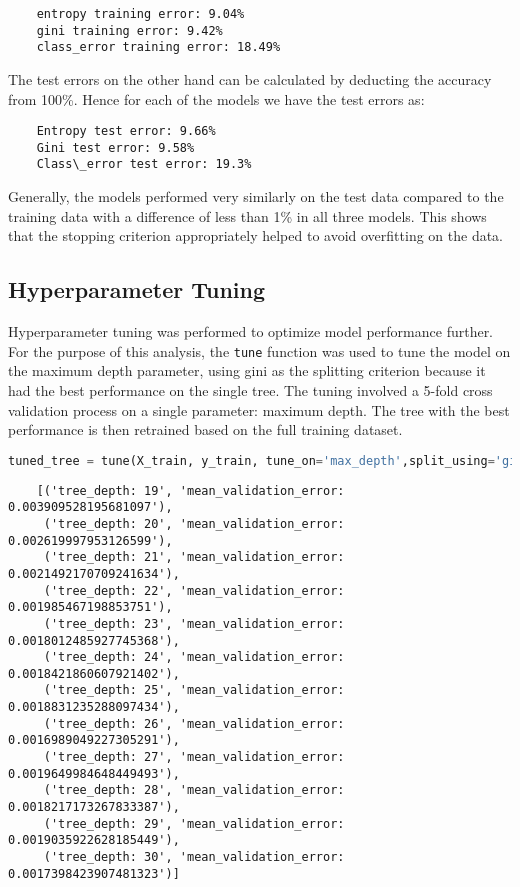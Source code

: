 \documentclass{article}
\begin{document}
\begin{lstlisting}
    entropy training error: 9.04%
    gini training error: 9.42%
    class_error training error: 18.49%
\end{lstlisting}

The test errors on the other hand can be calculated by deducting the accuracy from 100\%. Hence for each of the models we have the test errors as:

\begin{lstlisting}
    Entropy test error: 9.66%
    Gini test error: 9.58%
    Class\_error test error: 19.3%
\end{lstlisting}

Generally, the models performed very similarly on the test data compared to the training data with a difference of less than 1\% in all three models. This shows that the stopping criterion appropriately helped to avoid overfitting on the data.

\subsection{Hyperparameter Tuning}

Hyperparameter tuning was performed to optimize model performance further. For the purpose of this analysis, the \texttt{tune} function was used to tune the model on the maximum depth parameter, using gini as the splitting criterion because it had the best performance on the single tree. The tuning involved a 5-fold cross validation process on a single parameter: maximum depth. The tree with the best performance is then retrained based on the full training dataset.

\begin{lstlisting}[language=Python, caption=Hyperparameter Tuning, label=code:hyperparameter_tuning]
tuned_tree = tune(X_train, y_train, tune_on='max_depth',split_using='gini', start=19, stop=31)
\end{lstlisting}

\begin{lstlisting}
    [('tree_depth: 19', 'mean_validation_error: 0.003909528195681097'),
     ('tree_depth: 20', 'mean_validation_error: 0.002619997953126599'),
     ('tree_depth: 21', 'mean_validation_error: 0.0021492170709241634'),
     ('tree_depth: 22', 'mean_validation_error: 0.001985467198853751'),
     ('tree_depth: 23', 'mean_validation_error: 0.0018012485927745368'),
     ('tree_depth: 24', 'mean_validation_error: 0.0018421860607921402'),
     ('tree_depth: 25', 'mean_validation_error: 0.0018831235288097434'),
     ('tree_depth: 26', 'mean_validation_error: 0.0016989049227305291'),
     ('tree_depth: 27', 'mean_validation_error: 0.0019649984648449493'),
     ('tree_depth: 28', 'mean_validation_error: 0.0018217173267833387'),
     ('tree_depth: 29', 'mean_validation_error: 0.0019035922628185449'),
     ('tree_depth: 30', 'mean_validation_error: 0.0017398423907481323')]
\end{lstlisting}
\end{document}

